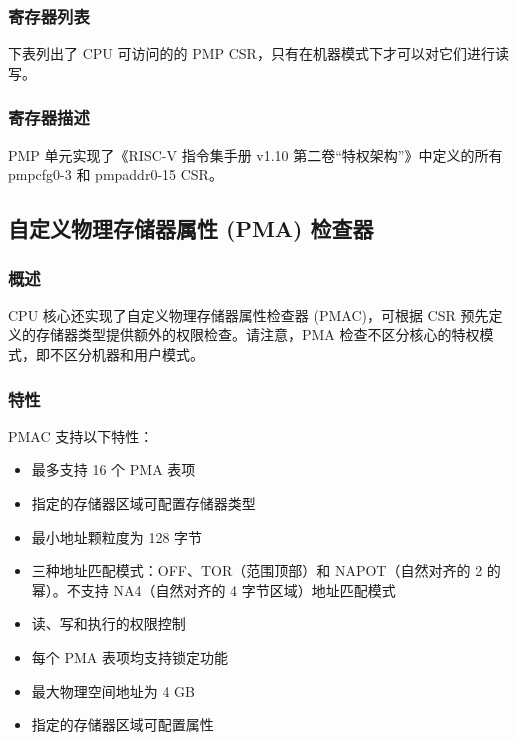 \documentclass[main\_\_CN.tex]{subfiles}
\begin{document}
\subsubsection{寄存器列表}
\label{sec:riscvcpu-pmp-reg-summ}

下表列出了 CPU 可访问的的 PMP CSR，只有在机器模式下才可以对它们进行读写。




\subsubsection{寄存器描述}
\label{sec:riscvcpu-pmp-reg-desc}

PMP 单元实现了《RISC-V 指令集手册 v1.10 第二卷“特权架构”》中定义的所有 pmpcfg0-3 和 pmpaddr0-15 CSR。




\newpage
\subsection{自定义物理存储器属性 (PMA) 检查器}
\label{sec:riscvcpu-pma}
\subsubsection{概述}
\label{sec:riscvcpu-pma-overview}
CPU 核心还实现了自定义物理存储器属性检查器 (PMAC)，可根据 CSR 预先定义的存储器类型提供额外的权限检查。请注意，PMA 检查不区分核心的特权模式，即不区分机器和用户模式。


\subsubsection{特性}
\label{sec:riscvcpu-pma-features}

PMAC 支持以下特性：

\begin{itemize}
    \item 最多支持 16 个 PMA 表项
    \item 指定的存储器区域可配置存储器类型
    \item 最小地址颗粒度为 128 字节
    \item 三种地址匹配模式：OFF、TOR（范围顶部）和 NAPOT（自然对齐的 2 的幂）。不支持 NA4（自然对齐的 4 字节区域）地址匹配模式
    \item 读、写和执行的权限控制
    \item 每个 PMA 表项均支持锁定功能
    \item 最大物理空间地址为 4 GB
    \item 指定的存储器区域可配置属性
\end{itemize}
\end{document}
